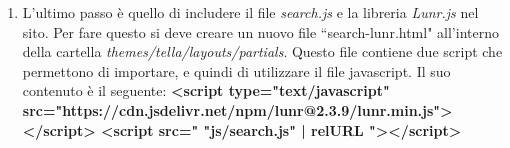 \documentclass[target=bach,aauheader=]{thud}
\begin{document}
\begin{enumerate}
    \item L'ultimo passo è quello di includere il file \textit{search.js} e la libreria \textit{Lunr.js} nel sito. Per fare questo si deve creare un nuovo file ``search-lunr.html" all'interno della cartella \textit{themes/tella/layouts/partials}. 
    Questo file contiene due script che permettono di importare, e quindi di utilizzare il file javascript. Il suo contenuto è il seguente:
    \newline \newline
    \textbf{
        \textless script type="text/javascript" src="https://cdn.jsdelivr.net/npm/lunr@2.3.9/lunr.min.js"\textgreater} \textbf{\textless /script\textgreater
        \newline
        \textless script src="{{ "js/search.js" | relURL }}"\textgreater \textless /script\textgreater
    }
\end{enumerate}
\end{document}

